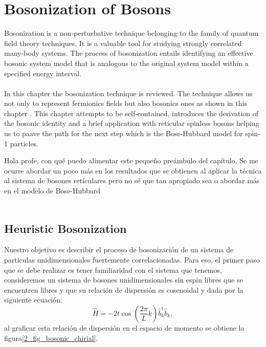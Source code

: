 \chapter{Bosonization of Bosons}
Bosonization is a non-perturbative technique belonging to the family of quantum field theory techniques. It is a valuable tool for studying strongly correlated many-body systems. The process of
bosonization entails identifying an effective bosonic system model that is analogous to the original system model within a specified energy interval. \\ \\

\newpage
In this chapter the bosonization technique is reviewed. The technique allows us not only to represent fermionics fields but also bosonics ones as shown in this chapter . This chapter attempts to be self-contained, introduces the derivation of the bosonic identity and a brief application with reticular spinless bosons helping us to paave the path for the next step which is the Bose-Hubbard model for  spin-1 particles.



\textcolor{UVred}{Hola profe, con qué puedo alimentar este pequeño preámbulo del capítulo. Se me ocurre abordar un poco más en los resultados que se obtienen al aplicar la técnica al sistema de bosones retículares pero no sé que tan apropiado sea o abordar más en el modelo de Bose-Hubbard}\\ \\




\section{Heuristic Bosonization}
Nuestro objetivo es describir el proceso de bosonización de un sistema de particulas unidimensionales fuertemente correlacionadas. Para eso, el primer paso que se debe realizar es tener familiaridad con el sistema que tenemos, consideremos un sistema de bosones unidimensionales sin espin libres que se encuentren libres y que su relación de dispersión es cosenoidal y dada por la siguiente ecuación:
\begin{equation} \label{2_H_free_bosons}
    \hat{H} = -2t\cos{\left(\frac{2\pi}{L} k\right)} \hat{b}^{\dagger}_{k}\hat{b}^{}_{k},
\end{equation}
al graficar esta relación de dispersión en el espacio de momento se obtiene la figura\ref{2_fig_bosonic_chirial}.

